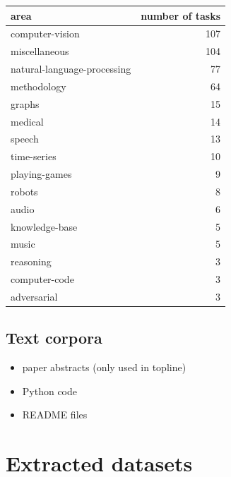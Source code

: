 \documentclass[11pt]{report}
\begin{document}
\begin{center}

\begin{tabular}{lr}
\toprule
area & number of tasks  \\
\midrule
\hline
computer-vision             &   107 \\
miscellaneous               &   104 \\
natural-language-processing &    77 \\
methodology                 &    64 \\
graphs                      &    15 \\
medical                     &    14 \\
speech                      &    13 \\
time-series                 &    10 \\
playing-games               &     9 \\
robots                      &     8 \\
audio                       &     6 \\
knowledge-base              &     5 \\
music                       &     5 \\
reasoning                   &     3 \\
computer-code               &     3 \\
adversarial                 &     3 \\
\bottomrule
\end{tabular}

\end{center}

\subsection{Text corpora}



\begin{itemize}

\item paper abstracts (only used in topline)

\item Python code

\item README files

\end{itemize}



\section{Extracted datasets}
\end{document}
